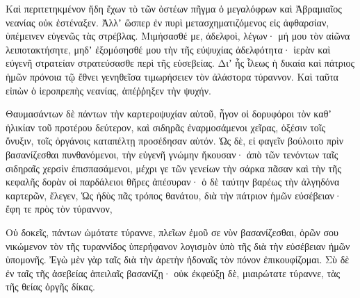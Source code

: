{\par }{\PP {}Καὶ περιτετηκμένον ἤδη ἔχων τὸ τῶν ὀστέων πῆγμα ὁ μεγαλόφρων καὶ Ἀβραμιαῖος νεανίας οὐκ ἐστέναξεν.
Ἀλλʼ ὥσπερ ἐν πυρὶ μετασχηματιζόμενος εἰς ἀφθαρσίαν, ὑπέμεινεν εὐγενῶς τὰς στρέβλας.
Μιμήσασθέ με, ἀδελφοὶ, λέγων· μή μου τὸν αἰῶνα λειποτακτήσητε, μηδʼ ἐξομόσησθέ μου τὴν τῆς εὐψυχίας ἀδελφότητα· ἱερὰν καὶ εὐγενῆ στρατείαν στρατεύσασθε περὶ τῆς εὐσεβείας.
Διʼ ἧς ἷλεως ἡ δικαία καὶ πάτριος ἡμῶν πρόνοια τῷ ἔθνει γενηθεῖσα τιμωρήσειεν τὸν ἀλάστορα τύραννον.
Καὶ ταῦτα εἰπὼν ὁ ἱεροπρεπὴς νεανίας, ἀπέῤῥηξεν τὴν ψυχήν.
\par }{\PP {}Θαυμασάντων δὲ πάντων τὴν καρτεροψυχίαν αὐτοῦ, ἦγον οἱ δορυφόροι τὸν καθʼ ἡλικίαν τοῦ προτέρου δεύτερον, καὶ σιδηρᾶς ἐναρμοσάμενοι χεῖρας, ὀξέσιν τοῖς ὄνυξιν, τοῖς ὀργάνοις καταπέλτῃ προσέδησαν αὐτόν.
Ὡς δὲ, εἰ φαγεῖν βούλοιτο πρὶν βασανίζεσθαι πυνθανόμενοι, τὴν εὐγενῆ γνώμην ἤκουσαν·
ἀπὸ τῶν τενόντων ταῖς σιδηραῖς χερσὶν ἐπισπασάμενοι, μέχρι γε τῶν γενείων τὴν σάρκα πᾶσαν καὶ τὴν τῆς κεφαλῆς δορὰν οἱ παρδάλειοι θῆρες ἀπέσυραν· ὁ δὲ ταύτην βαρέως τὴν ἀλγηδόνα καρτερῶν, ἔλεγεν,
Ὡς ἡδὺς πᾶς τρόπος θανάτου, διὰ τὴν πάτριον ἡμῶν εὐσέβειαν· ἔφη τε πρὸς τὸν τύραννον,
\par }{\PP {}Οὐ δοκεῖς, πάντων ὠμότατε τύραννε, πλεῖων ἐμοῦ σε νὺν βασανίζεσθαι, ὁρῶν σου νικώμενον τὸν τῆς τυραννίδος ὑπερήφανον λογισμὸν ὑπὸ τῆς διὰ τὴν εὐσέβειαν ἡμῶν ὑπομονῆς.
Ἐγὼ μὲν γὰρ ταῖς διὰ τὴν ἀρετὴν ἡδοναῖς τὸν πόνον ἐπικουφίζομαι.
Σὺ δὲ ἐν ταῖς τῆς ἀσεβείας ἀπειλαῖς βασανίζῃ· οὐκ ἐκφεύξῃ δὲ, μιαιρώτατε τύραννε, τὰς τῆς θείας ὀργῆς δίκας.

}
